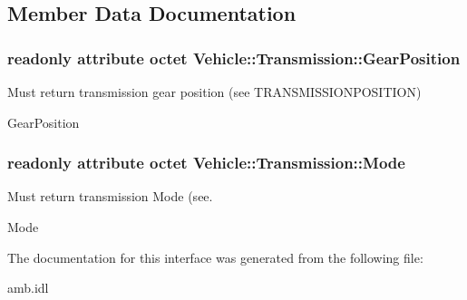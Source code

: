 \subsection{Member Data Documentation}
\hypertarget{interfaceVehicle_1_1Transmission_a71c554ce9d892f772432551eea69f7ec}{
\subsubsection[{Gear\-Position}]{\setlength{\rightskip}{0pt plus 5cm}readonly attribute octet Vehicle\-::\-Transmission\-::\-Gear\-Position}}\label{interfaceVehicle_1_1Transmission_a71c554ce9d892f772432551eea69f7ec}


Must return transmission gear position (see T\-R\-A\-N\-S\-M\-I\-S\-S\-I\-O\-N\-P\-O\-S\-I\-T\-I\-O\-N) 

Gear\-Position \hypertarget{interfaceVehicle_1_1Transmission_a2b5b6c11767058181b5ad3fad8bd6d32}{
\subsubsection[{Mode}]{\setlength{\rightskip}{0pt plus 5cm}readonly attribute octet Vehicle\-::\-Transmission\-::\-Mode}}\label{interfaceVehicle_1_1Transmission_a2b5b6c11767058181b5ad3fad8bd6d32}


Must return transmission Mode (see. 

Mode 

The documentation for this interface was generated from the following file\-:\begin{DoxyCompactItemize}
\item 
amb.\-idl\end{DoxyCompactItemize}
